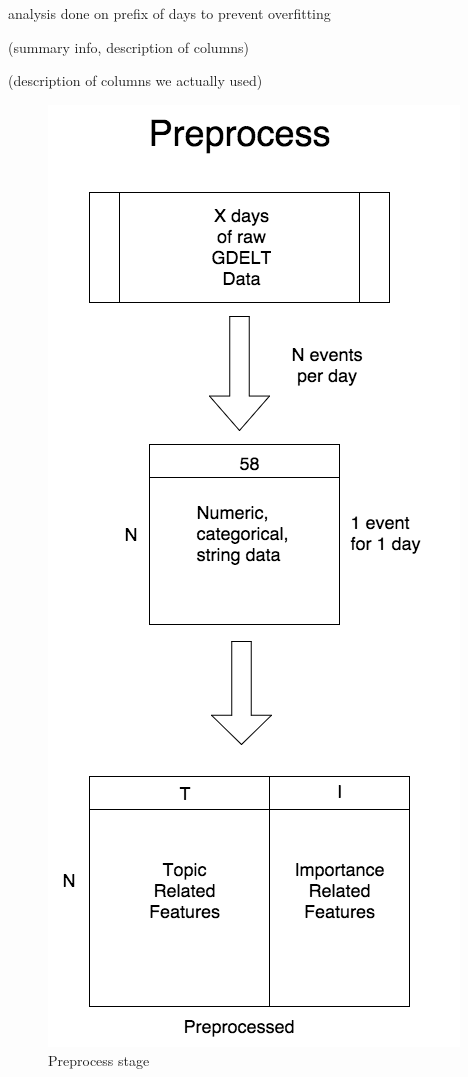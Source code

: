 

analysis done on prefix of days to prevent overfitting \cite{leetaru2013gdelt}

(summary info, description of columns)

(description of columns we actually used)

\begin{figure}[ht]
\vskip 0.2in
\begin{center}
\centerline{\includegraphics[scale=0.15]{images/preprocess_vertical.png}}
\caption{Preprocess stage}
\end{center}
\vskip -0.2in
\label{fig:preprocess}
\end{figure} 


